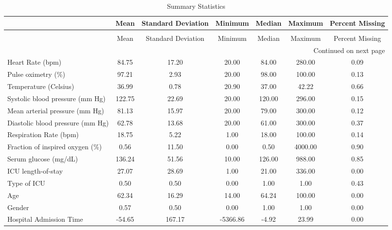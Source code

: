\begin{longtable}{lcccccc}
\caption{Summary Statistics}
\label{tab_describe}\\
\toprule
\hline
{} &   Mean & Standard Deviation &  Minimum & Median & Maximum & Percent Missing \\
\hline
\midrule
\endfirsthead
\caption[]{Summary Statistics} \\
\toprule
{} &   Mean & Standard Deviation &  Minimum & Median & Maximum & Percent Missing \\
\midrule
\endhead
\midrule
\multicolumn{7}{r}{{Continued on next page}} \\
\midrule
\hline
\endfoot

\bottomrule
\endlastfoot
Heart Rate (bpm)                 &  84.75 &              17.20 &    20.00 &  84.00 &  280.00 &            0.09 \\
Pulse oximetry (\%)               &  97.21 &               2.93 &    20.00 &  98.00 &  100.00 &            0.13 \\
Temperature (Celsius)            &  36.99 &               0.78 &    20.90 &  37.00 &   42.22 &            0.66 \\
Systolic blood pressure (mm Hg)  & 122.75 &              22.69 &    20.00 & 120.00 &  296.00 &            0.15 \\
Mean arterial pressure (mm Hg)   &  81.13 &              15.97 &    20.00 &  79.00 &  300.00 &            0.12 \\
Diastolic blood pressure (mm Hg) &  62.78 &              13.68 &    20.00 &  61.00 &  300.00 &            0.37 \\
Respiration Rate (bpm)           &  18.75 &               5.22 &     1.00 &  18.00 &  100.00 &            0.14 \\
Fraction of inspired oxygen (\%)  &   0.56 &              11.50 &     0.00 &   0.50 & 4000.00 &            0.90 \\
Serum glucose (mg/dL)            & 136.24 &              51.56 &    10.00 & 126.00 &  988.00 &            0.85 \\
ICU length-of-stay               &  27.07 &              28.69 &     1.00 &  21.00 &  336.00 &            0.00 \\
Type of ICU                      &   0.50 &               0.50 &     0.00 &   1.00 &    1.00 &            0.43 \\
Age                              &  62.34 &              16.29 &    14.00 &  64.24 &  100.00 &            0.00 \\
Gender                           &   0.57 &               0.50 &     0.00 &   1.00 &    1.00 &            0.00 \\
Hospital Admission Time          & -54.65 &             167.17 & -5366.86 &  -4.92 &   23.99 &            0.00 \\
\end{longtable}
